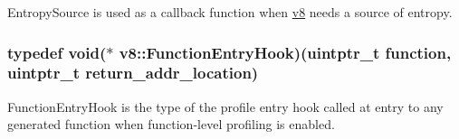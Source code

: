 Entropy\-Source is used as a callback function when \hyperlink{namespacev8}{v8} needs a source of entropy. \hypertarget{namespacev8_ad971c67718652f0d12cac5c0a0161e6c}{
\subsubsection[{Function\-Entry\-Hook}]{\setlength{\rightskip}{0pt plus 5cm}typedef void($\ast$ v8\-::\-Function\-Entry\-Hook)(uintptr\-\_\-t function, uintptr\-\_\-t return\-\_\-addr\-\_\-location)}}\label{namespacev8_ad971c67718652f0d12cac5c0a0161e6c}
Function\-Entry\-Hook is the type of the profile entry hook called at entry to any generated function when function-\/level profiling is enabled.


